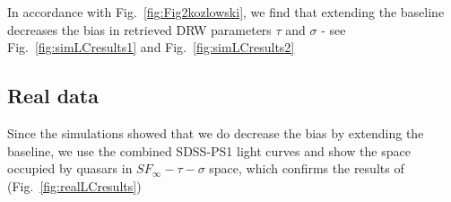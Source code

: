 \documentclass[twocolumn]{aastex62}
\begin{document}
In accordance with Fig.~\ref{fig:Fig2kozlowski}, we find that extending the baseline decreases the bias in retrieved DRW parameters  $\tau$ and $\sigma$ - see Fig.~\ref{fig:simLCresults1} and Fig.~\ref{fig:simLCresults2}


\begin{figure*}
\caption{Retrieved $\tau$ and $\sigma$  parameters for simulated LCs. }
\label{fig:simLCresults1}
\end{figure*} 

\begin{figure*}
\caption{Comparison of retrieved parameters in relation to input parameters, shown as Fig.18 in \citet{macleod2011} }
\label{fig:simLCresults2}
\end{figure*} 


\subsection{Real data}

Since the simulations showed that we do decrease the bias by extending the  baseline, we use the combined SDSS-PS1  light curves and show the space occupied by quasars in $SF_{\infty} - \tau - \sigma$ space, which confirms the results of \citet{macleod2011} (Fig.~\ref{fig:realLCresults})


\begin{figure*}
\caption{Both relations are shown in the observed frame. The left panel is like Fig.6, and the right like Fig.14 in \citet{macleod2011}. }
\label{fig:realLCresults}
\end{figure*} 







 


\end{document}
